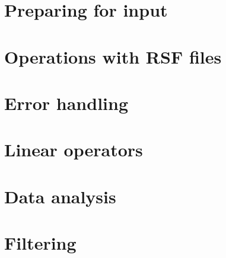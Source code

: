 \chapter{Preparing for input}\label{sec:input}
   
\chapter{Operations with RSF files}\label{sec:files}

\chapter{Error handling}\label{sec:error}

\chapter{Linear operators}\label{sec:lop}
   


\chapter{Data analysis}\label{sec:analysis}


\chapter{Filtering}\label{sec:filter}


